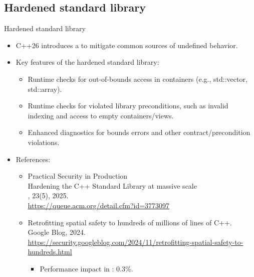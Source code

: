 \subsection{Hardened standard library}

\begin{frame}[t,fragile]{Hardened standard library}
  \begin{itemize}
    \item C++26 introduces a  to mitigate common sources of undefined behavior.
    \item Key features of the hardened standard library:
      \begin{itemize}
        \item Runtime checks for out-of-bounds access in containers (e.g., std::vector, std::array).
        \item Runtime checks for violated library preconditions, such as invalid indexing and access to empty containers/views.
        \item Enhanced diagnostics for bounds errors and other contract/precondition violations.
      \end{itemize}

    \item References:
      \begin{itemize}
        \item Practical Security in Production\\
        Hardening the C++ Standard Library at massive scale\\
        , 23(5), 2025.\\
        \url{https://queue.acm.org/detail.cfm?id=3773097}

        \item Retrofitting spatial safety to hundreds of millions of lines of C++.\\
        Google Blog, 2024.\\
        \url{https://security.googleblog.com/2024/11/retrofitting-spatial-safety-to-hundreds.html}

          \begin{itemize}
            \item Performance impact in : 0.3\%.
          \end{itemize}
      \end{itemize}
  \end{itemize}
\end{frame}


